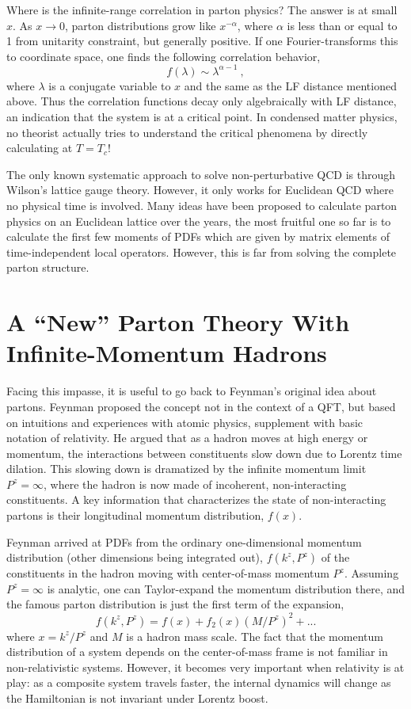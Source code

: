 \documentclass[prd,aps,twocolumn,preprintnumbers,showpacs,nofootinbib,superscriptaddress,notitlepage]{revtex4-1}
\begin{document}
Where is the infinite-range correlation in parton physics?
The answer is at small $x$. As $x\to 0$, parton distributions
grow like $x^{-\alpha}$, where $\alpha$ is less than or equal to 1
from unitarity constraint, but generally positive.
If one Fourier-transforms this to coordinate space,
one finds the following correlation behavior,
\begin{equation}
   f(\lambda) \sim \lambda^{\alpha-1} \ ,
\end{equation}
where $\lambda$ is a conjugate variable to $x$ and the same
as the LF distance mentioned above.
Thus the correlation functions decay only algebraically with LF distance, an indication that
the system is at a critical point. In
condensed matter physics, no theorist actually tries
to understand the critical phenomena by directly
calculating at $T=T_c$!

The only known systematic approach to
solve non-perturbative QCD is
through Wilson's lattice gauge theory.
However, it only works for Euclidean QCD where
no physical time is involved. Many ideas have been
proposed to calculate parton physics on an Euclidean
lattice over the years, the most fruitful one so far is
to calculate the first few moments of PDFs which are given
by matrix elements of time-independent local operators.
However, this is far from solving the complete
parton structure.

\section{A ``New'' Parton Theory With Infinite-Momentum Hadrons}

Facing this impasse, it is useful to go back to Feynman's
original idea about partons. Feynman proposed the concept not
in the context of a QFT, but based on intuitions and experiences
with atomic physics, supplement with basic notation of relativity.
He argued that as a hadron moves at high energy or momentum, the interactions
between constituents slow down due to Lorentz
time dilation. This slowing down is dramatized by
the infinite momentum limit $P^z=\infty$, where
the hadron is now made of incoherent, non-interacting
constituents. A key information that
characterizes the state of non-interacting partons
is their longitudinal momentum distribution, $f(x)$.

Feynman arrived at PDFs from the ordinary one-dimensional
momentum distribution (other dimensions being integrated out),
$f(k^z, P^z)$ of the constituents in the hadron moving with
center-of-mass momentum $P^z$. Assuming $P^z=\infty$ is analytic,
one can Taylor-expand the momentum distribution there,
and the famous parton distribution is just the
first term of the expansion,
\begin{equation}
  f(k^z, P^z) = f(x) + f_2(x)(M/P^z)^2 + ...
\label{Eq:expansion}
\end{equation}
where $x=k^z/P^z$ and $M$ is
a hadron mass scale. The fact that the momentum distribution
of a system depends on the center-of-mass frame
is not familiar in non-relativistic systems. However,
it becomes very important when relativity is at play:
as a composite system travels faster, the internal dynamics
will change as the Hamiltonian is not invariant under
Lorentz boost.
\end{document}
